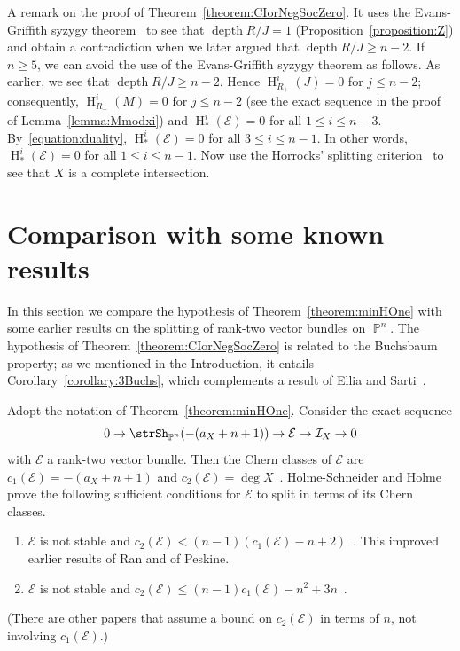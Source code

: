 \documentclass[11pt,a4paper]{amsart}
\theoremstyle{plain}
\theoremstyle{definition}
\newcommand{\calE}{\mathcal E}
\newcommand{\calI}{\mathcal I}
\DeclareMathOperator{\projective}{\mathbb{P}}
\DeclareMathOperator{\depth}{depth}
\DeclareMathOperator{\homology}{H}
\begin{document}
A remark on the proof of Theorem~\ref{theorem:CIorNegSocZero}.
It uses the Evans-Griffith syzygy
theorem~\cite[Theorem~1.1]{EvansGriffithSyzProb1981} to see that $\depth
R/J =1$
(Proposition~\ref{proposition:Z}) and obtain a contradiction when we later
argued that $\depth R/J \geq n-2$. 
If $n \geq 5$, we can avoid the use 
of the Evans-Griffith syzygy theorem as follows. 
As earlier, we see that $\depth R/J \geq n-2$. 
Hence $\homology^i_{R_+}(J)=0$ for $j \leq n-2$; consequently,
$\homology^i_{R_+}(M)=0$ for $j \leq n-2$ (see the exact sequence in the
proof of Lemma~\ref{lemma:Mmodxi})
and $\homology^i_*(\calE)=0$ for all $1 \leq i \leq n-3$.
By~\eqref{equation:duality}, 
$\homology^i_*(\calE)=0$ for all $3 \leq i \leq n-1$.
In other words, $\homology^i_*(\calE)=0$ for all $1 \leq i \leq n-1$.
Now use the Horrocks' splitting 
criterion~\cite[Chapter~1, Theorem~2.3.1]{OSSvb2011}
to see that $X$ is a complete intersection.

\section{Comparison with some known results}
\label{section:compare}

In this section we compare the hypothesis of Theorem~\ref{theorem:minHOne}
with some earlier results on the splitting of rank-two vector bundles on
$\projective^n$. The hypothesis of Theorem~\ref{theorem:CIorNegSocZero} is
related to the Buchsbaum property; 
as we mentioned in the Introduction, it entails
Corollary~\ref{corollary:3Buchs}, which complements a result of Ellia and
Sarti~\cite[Proposition~13]{ElliaSartikBuchs1999}.

Adopt the notation of Theorem~\ref{theorem:minHOne}.
Consider the exact sequence
\begin{equation}
\label{equation:EIX}
0 \to \strSh_{\projective^n}(-(a_X+n+1)) \to \calE \to \calI_X \to 0
\end{equation}
with $\calE$ a rank-two vector bundle.
Then the Chern classes of $\calE$ are $c_1(\calE) = -(a_X+n+1)$ and
$c_2(\calE) = \deg X$~\cite[Chapter~1, 5.1.1]{OSSvb2011}.
Holme-Schneider \cite {HolmeSchnComputerAided1985} and
Holme~\cite {HolmeCodimTwo1989} prove the following sufficient
conditions for $\calE$ to split in terms of its Chern classes.
\begin{enumerate}

\item
$\calE$ is not stable and $c_2(\calE) < (n-1)
(c_1(\calE)-n+2)$~\cite[Theorem~4.2]{HolmeSchnComputerAided1985}.
This improved earlier results of Ran and of Peskine.

\item
$\calE$ is not stable and $c_2(\calE) \leq
(n-1)c_1(\calE)-n^2+3n$~\cite[Theorem~7.1]{HolmeCodimTwo1989}.
\end{enumerate}
(There are other papers that assume a bound on $c_2(\calE)$ in terms of
$n$, not involving $c_1(\calE)$.)
\end{document}
